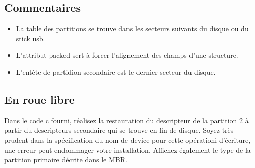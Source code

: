 \subsection{Commentaires}
\begin{itemize}
\item La table des partitions se trouve dans les secteurs suivants du disque ou du stick usb.
\item L'attribut packed sert à forcer l'alignement des champs d'une structure.
\item L'entète de partidion secondaire est le dernier secteur du disque.
\end{itemize}
\subsection{En roue libre}
Dans le code c fourni, réalisez la restauration du descripteur de la partition 2 à partir du descripteurs secondaire qui se trouve en fin de disque. Soyez très prudent dans la spécification du nom de device pour cette opérationi d'écriture, une erreur peut endommager votre installation. Affichez également le type de la partition primaire décrite dans le MBR.
\newpage
